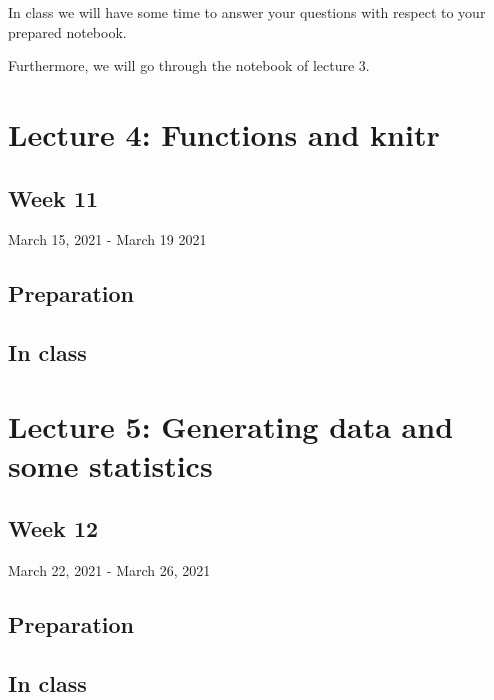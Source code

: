 \documentclass[
]{book}
\begin{document}
In class we will have some time to answer your questions with respect to your prepared notebook.

Furthermore, we will go through the notebook of lecture 3.

\hypertarget{lecture-4-functions-and-knitr}{%
\section{Lecture 4: Functions and knitr}\label{lecture-4-functions-and-knitr}}

\hypertarget{week-11}{%
\subsection{Week 11}\label{week-11}}

March 15, 2021 - March 19 2021

\hypertarget{preparation-3}{%
\subsection{Preparation}\label{preparation-3}}

\hypertarget{in-class-3}{%
\subsection{In class}\label{in-class-3}}

\hypertarget{lecture-5-generating-data-and-some-statistics}{%
\section{Lecture 5: Generating data and some statistics}\label{lecture-5-generating-data-and-some-statistics}}

\hypertarget{week-12}{%
\subsection{Week 12}\label{week-12}}

March 22, 2021 - March 26, 2021

\hypertarget{preparation-4}{%
\subsection{Preparation}\label{preparation-4}}

\hypertarget{in-class-4}{%
\subsection{In class}\label{in-class-4}}
\end{document}
